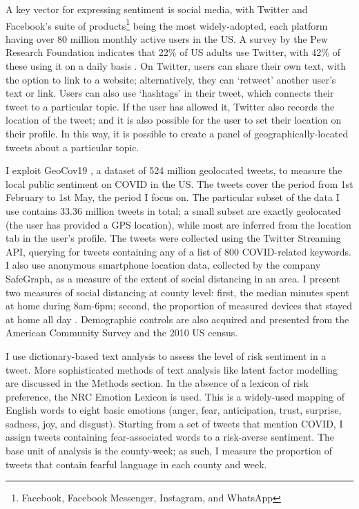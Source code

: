 \documentclass{article}
\begin{document}
A key vector for expressing sentiment is social media, with Twitter and Facebook's suite of products\footnote{Facebook, Facebook Messenger, Instagram, and WhatsApp} being the most widely-adopted, each platform having over 80 million monthly active users in the US. A survey by the Pew Research Foundation indicates that 22\% of US adults use Twitter, with 42\% of these using it on a daily basis \parencite{perrinShareAdultsUsing2019}. On Twitter, users can share their own text, with the option to link to a website; alternatively, they can `retweet' another user's text or link. Users can also use `hashtags' in their tweet, which connects their tweet to a particular topic. If the user has allowed it, Twitter also records the location of the tweet; and it is also possible for the user to set their location on their profile. In this way, it is possible to create a panel of geographically-located tweets about a particular topic. 

I exploit GeoCov19 \parencite{qaziGeoCoV19DatasetHundreds2020a}, a dataset of 524 million geolocated tweets, to measure the local public sentiment on COVID in the US. The tweets cover the period from 1st February to 1st May, the period I focus on. The particular subset of the data I use contains 33.36 million tweets in total; a small subset are exactly geolocated (the user has provided a GPS location), while most are inferred from the location tab in the user's profile. The tweets were collected using the Twitter Streaming API, querying for tweets containing any of a list of 800 COVID-related keywords. I also use anonymous smartphone location data, collected by the company SafeGraph, as a measure of the extent of social distancing in an area. I present two measures of social distancing at county level: first, the median minutes spent at home during 8am-6pm; second, the proportion of measured devices that stayed at home all day \parencite{safegraphinc.SocialDistancingMetrics2020}. Demographic controls are also acquired and presented from the American Community Survey and the 2010 US census. 

I use dictionary-based text analysis to assess the level of risk sentiment in a tweet. More sophisticated methods of text analysis like latent factor modelling are discussed in the Methods section. In the absence of a lexicon of risk preference, the NRC Emotion Lexicon \parencite{mohammadCrowdsourcingWordEmotion2013} is used. This is a widely-used mapping of English words to eight basic emotions (anger, fear, anticipation, trust, surprise, sadness, joy, and disgust). Starting from a set of tweets that mention COVID, I assign tweets containing fear-associated words to a risk-averse sentiment. The base unit of analysis is the county-week; as such, I measure the proportion of tweets that contain fearful language in each county and week. 
\end{document}
